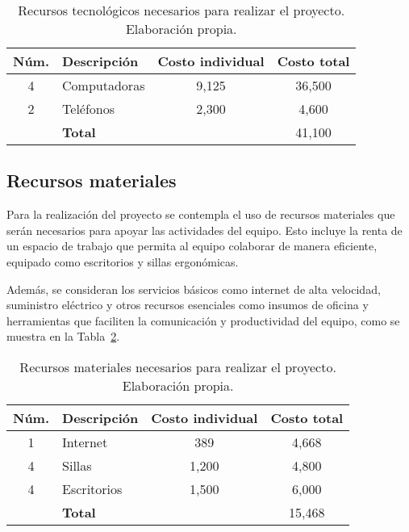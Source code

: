 \begin{table}[h!]
	\centering
	\begin{tabular}{|c|l|c|c|}
		\hline
		\textbf{Núm.} & \textbf{Descripción}              & \textbf{Costo individual} & \textbf{Costo total} \\ \hline
		4             & Computadoras                     & 9,125                    & 36,500               \\ \hline
		2             & Teléfonos                        & 2,300                    & 4,600                \\ \hline
		& \textbf{Total}                  &                           & 41,100               \\ \hline
	\end{tabular}
	\caption{Recursos tecnológicos necesarios para realizar el proyecto. Elaboración propia.}
	\label{tabla:recursos-tecnologicos}
\end{table}


\subsection*{Recursos materiales}
Para la realización del proyecto se contempla el uso de recursos materiales que serán necesarios para apoyar las actividades del equipo. Esto incluye la renta de un espacio de trabajo que permita al equipo colaborar de manera eficiente, equipado como escritorios y sillas ergonómicas.
 
Además, se consideran los servicios básicos como internet de alta velocidad, suministro eléctrico y otros recursos esenciales como insumos de oficina y herramientas que faciliten la comunicación y productividad del equipo, como se muestra en la Tabla~\ref{tabla:recursos-materiales}. 

\begin{table}[h!]
	\centering
	\begin{tabular}{|c|l|c|c|}
		\hline
		\textbf{Núm.} & \textbf{Descripción}              & \textbf{Costo individual} & \textbf{Costo total} \\ \hline
		1             & Internet                 & 389                     & 4,668                \\ \hline
		4             & Sillas                            & 1,200                     & 4,800                \\ \hline
		4             & Escritorios                       & 1,500                     & 6,000                \\ \hline
		& \textbf{Total}                   &                      & 15,468               \\ \hline
	\end{tabular}
	\caption{Recursos materiales necesarios para realizar el proyecto. Elaboración propia.}
	\label{tabla:recursos-materiales}
\end{table}


